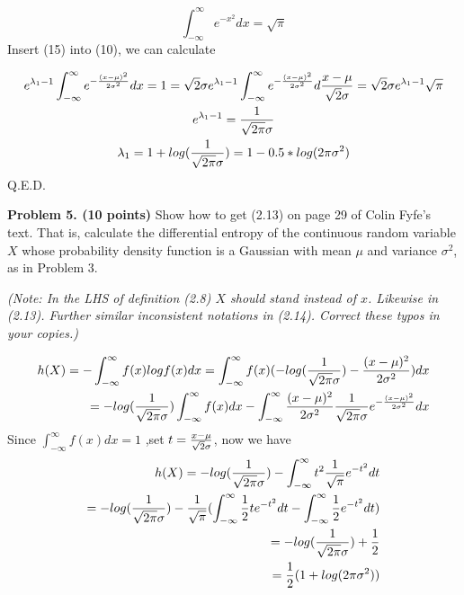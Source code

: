 \documentclass[epsfig]{article}
\def\bpar{\vskip26pt}
\def\spar{\vskip10pt}
\begin{document}
\begin{equation}
\int_{-\infty}^\infty {e^{-x^2}} dx=\sqrt{\pi}
\end{equation}
Insert (15) into (10), we can calculate

\begin{gather}
e^{\lambda_1-1}\int_{-\infty}^\infty {e^{-{(x-\mu)^2\over{2\sigma^2}}}}dx=1=\sqrt{2}\sigma e^{\lambda_1-1}\int_{-\infty}^\infty {e^{-{(x-\mu)^2\over{2\sigma^2}}}}d{x-\mu\over{\sqrt{2}\sigma}}=\sqrt{2}\sigma e^{\lambda_1-1}\sqrt{\pi}\\
e^{\lambda_1-1}={1\over{\sqrt{2\pi}\sigma}}\\
\lambda_1=1+log({1\over{\sqrt{2\pi}\sigma}})=1-0.5*log(2\pi\sigma^2)
\end{gather}
Q.E.D.\spar
\centerline{\underline{\makebox[15cm][c]{}}}

\bpar
{\bf Problem 5. (10 points)}
\spar
Show how to get (2.13) on page 29 of Colin Fyfe's text. That is, calculate the differential entropy of the continuous random variable $X$ whose probability density function is a Gaussian with mean $\mu$ and variance $\sigma^2$, as in Problem 3. 

{\sl(Note: In the LHS of definition (2.8) $X$ should stand instead of $x$. Likewise in (2.13). Further similar inconsistent notations in (2.14). Correct these typos in your copies.)}\spar
\centerline{\underline{}}

\begin{align*}
h(X)=-\int_{-\infty}^\infty f(x)logf(x) dx=\int_{-\infty}^\infty f(x)(-log({1\over{\sqrt{2\pi}\sigma}})-{(x-\mu)^2\over{2\sigma^2}})dx\\
=-log({1\over{\sqrt{2\pi}\sigma}})\int_{-\infty}^\infty f(x)dx-\int_{-\infty}^\infty     {(x-\mu)^2\over{2\sigma^2}}{1\over{\sqrt{2\pi}\sigma}}e^{-{(x-\mu)^2\over{2\sigma^2}}}dx
\end{align*}
Since $\int_{-\infty}^\infty f(x)dx=1$ ,set $t={x-\mu\over{\sqrt{2}\sigma}}$, now we have
\begin{align*}
h(X)=-log({1\over{\sqrt{2\pi}\sigma}})-\int_{-\infty}^\infty     t^2{1\over{\sqrt{\pi}}}e^{-t^2}dt\\
=-log({1\over{\sqrt{2\pi}\sigma}})-{1\over{\sqrt{\pi}}}(\int_{-\infty}^\infty {1\over 2}te^{-t^2}dt-\int_{-\infty}^\infty {1\over 2}e^{-t^2}dt)\\
=-log({1\over{\sqrt{2\pi}\sigma}})+{1\over 2}\\
={1\over 2}(1+log(2\pi\sigma^2))
\end{align*}
\end{document}
